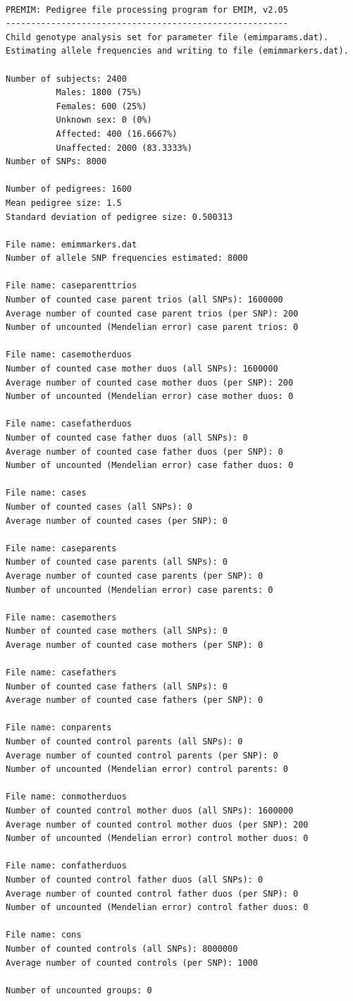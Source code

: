 \documentclass[a4paper,12pt]{article}
\begin{document}
\vspace{0.35cm} \begin{lstlisting}

PREMIM: Pedigree file processing program for EMIM, v2.05
--------------------------------------------------------
Child genotype analysis set for parameter file (emimparams.dat).
Estimating allele frequencies and writing to file (emimmarkers.dat).

Number of subjects: 2400
          Males: 1800 (75%)
          Females: 600 (25%)
          Unknown sex: 0 (0%)
          Affected: 400 (16.6667%)
          Unaffected: 2000 (83.3333%)
Number of SNPs: 8000

Number of pedigrees: 1600
Mean pedigree size: 1.5
Standard deviation of pedigree size: 0.500313

File name: emimmarkers.dat
Number of allele SNP frequencies estimated: 8000

File name: caseparenttrios
Number of counted case parent trios (all SNPs): 1600000
Average number of counted case parent trios (per SNP): 200
Number of uncounted (Mendelian error) case parent trios: 0

File name: casemotherduos
Number of counted case mother duos (all SNPs): 1600000
Average number of counted case mother duos (per SNP): 200
Number of uncounted (Mendelian error) case mother duos: 0

File name: casefatherduos
Number of counted case father duos (all SNPs): 0
Average number of counted case father duos (per SNP): 0
Number of uncounted (Mendelian error) case father duos: 0

File name: cases
Number of counted cases (all SNPs): 0
Average number of counted cases (per SNP): 0

File name: caseparents
Number of counted case parents (all SNPs): 0
Average number of counted case parents (per SNP): 0
Number of uncounted (Mendelian error) case parents: 0

File name: casemothers
Number of counted case mothers (all SNPs): 0
Average number of counted case mothers (per SNP): 0

File name: casefathers
Number of counted case fathers (all SNPs): 0
Average number of counted case fathers (per SNP): 0

File name: conparents
Number of counted control parents (all SNPs): 0
Average number of counted control parents (per SNP): 0
Number of uncounted (Mendelian error) control parents: 0

File name: conmotherduos
Number of counted control mother duos (all SNPs): 1600000
Average number of counted control mother duos (per SNP): 200
Number of uncounted (Mendelian error) control mother duos: 0

File name: confatherduos
Number of counted control father duos (all SNPs): 0
Average number of counted control father duos (per SNP): 0
Number of uncounted (Mendelian error) control father duos: 0

File name: cons
Number of counted controls (all SNPs): 8000000
Average number of counted controls (per SNP): 1000

Number of uncounted groups: 0

\end{lstlisting} \vspace{0.35cm}
\end{document}
